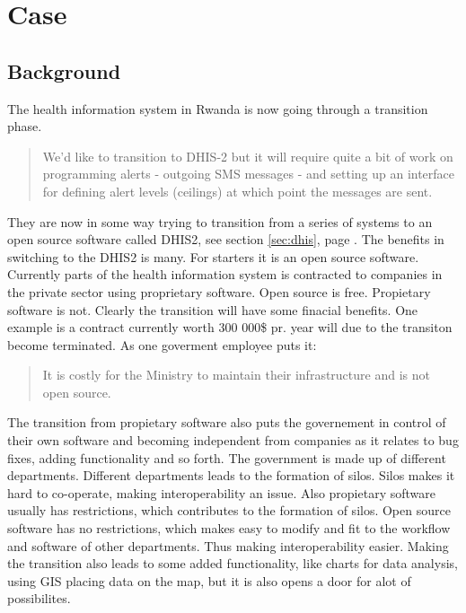 \chapter{Case}



\section{Background}
The health information system in Rwanda is now going through a transition phase. 
\begin{quote}
We'd like to transition to DHIS-2 but it will require quite a bit of work on programming alerts - outgoing SMS messages - and setting up an interface for defining alert levels (ceilings) at which point the messages are sent.
\end{quote}
They are now in some way trying to transition from a series of systems to an open source software called DHIS2, see section \ref{sec:dhis}, page \pageref{sec:dhis}.
The benefits in switching to the DHIS2 is many. For starters it is an open source software. Currently parts of the health information system is contracted to companies in the private sector using proprietary software. 
Open source is free. Propietary software is not. Clearly the transition will have some finacial benefits. 
One example is a contract currently worth 300 000\$ pr. year will due to the transiton become terminated.
As one goverment employee puts it:
\begin{quote}
It is costly for the Ministry to maintain their infrastructure and is not open source.
\end{quote}
The transition from propietary software also puts the governement in control of their own software and becoming independent from companies as it relates to bug fixes, adding functionality and so forth.
The government is made up of different departments. Different departments leads to the formation of silos. Silos makes it hard to co-operate, making interoperability an issue. 
Also propietary software usually has restrictions, which contributes to the formation of silos. 
Open source software has no restrictions, which makes easy to modify and fit to the workflow and software of other departments. 
Thus making interoperability easier. 
Making the transition also leads to some added functionality, like charts for data analysis, using GIS placing data on the map, but it is also opens a door for alot of possibilites. 


